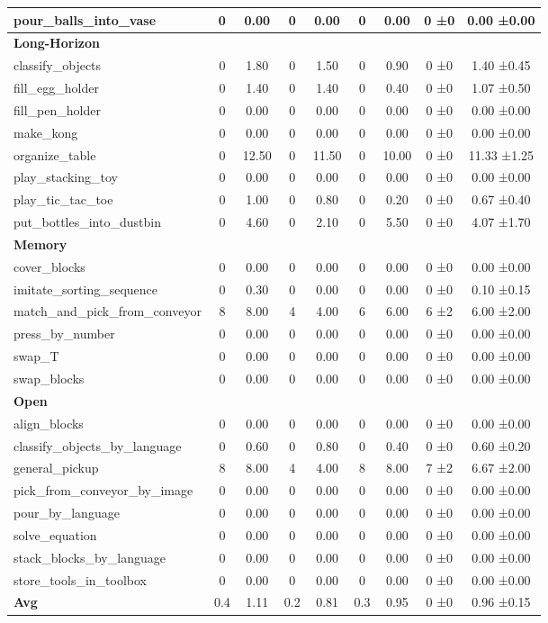 \begin{table}[H]
{\begin{tabular}{l|c|c|c|c|c|c|c|c}
pour\_balls\_into\_vase & 0 & 0.00 & 0 & 0.00 & 0 & 0.00 & 0 ±0 & 0.00 ±0.00 \\
\hline
\multicolumn{9}{l}{\textbf{Long-Horizon}} \\
classify\_objects & 0 & 1.80 & 0 & 1.50 & 0 & 0.90 & 0 ±0 & 1.40 ±0.45 \\
fill\_egg\_holder & 0 & 1.40 & 0 & 1.40 & 0 & 0.40 & 0 ±0 & 1.07 ±0.50 \\
fill\_pen\_holder & 0 & 0.00 & 0 & 0.00 & 0 & 0.00 & 0 ±0 & 0.00 ±0.00 \\
make\_kong & 0 & 0.00 & 0 & 0.00 & 0 & 0.00 & 0 ±0 & 0.00 ±0.00 \\
organize\_table & 0 & 12.50 & 0 & 11.50 & 0 & 10.00 & 0 ±0 & 11.33 ±1.25 \\
play\_stacking\_toy & 0 & 0.00 & 0 & 0.00 & 0 & 0.00 & 0 ±0 & 0.00 ±0.00 \\
play\_tic\_tac\_toe & 0 & 1.00 & 0 & 0.80 & 0 & 0.20 & 0 ±0 & 0.67 ±0.40 \\
put\_bottles\_into\_dustbin & 0 & 4.60 & 0 & 2.10 & 0 & 5.50 & 0 ±0 & 4.07 ±1.70 \\
\hline
\multicolumn{9}{l}{\textbf{Memory}} \\
cover\_blocks & 0 & 0.00 & 0 & 0.00 & 0 & 0.00 & 0 ±0 & 0.00 ±0.00 \\
imitate\_sorting\_sequence & 0 & 0.30 & 0 & 0.00 & 0 & 0.00 & 0 ±0 & 0.10 ±0.15 \\
match\_and\_pick\_from\_conveyor & 8 & 8.00 & 4 & 4.00 & 6 & 6.00 & 6 ±2 & 6.00 ±2.00 \\
press\_by\_number & 0 & 0.00 & 0 & 0.00 & 0 & 0.00 & 0 ±0 & 0.00 ±0.00 \\
swap\_T & 0 & 0.00 & 0 & 0.00 & 0 & 0.00 & 0 ±0 & 0.00 ±0.00 \\
swap\_blocks & 0 & 0.00 & 0 & 0.00 & 0 & 0.00 & 0 ±0 & 0.00 ±0.00 \\
\hline
\multicolumn{9}{l}{\textbf{Open}} \\
align\_blocks & 0 & 0.00 & 0 & 0.00 & 0 & 0.00 & 0 ±0 & 0.00 ±0.00 \\
classify\_objects\_by\_language & 0 & 0.60 & 0 & 0.80 & 0 & 0.40 & 0 ±0 & 0.60 ±0.20 \\
general\_pickup & 8 & 8.00 & 4 & 4.00 & 8 & 8.00 & 7 ±2 & 6.67 ±2.00 \\
pick\_from\_conveyor\_by\_image & 0 & 0.00 & 0 & 0.00 & 0 & 0.00 & 0 ±0 & 0.00 ±0.00 \\
pour\_by\_language & 0 & 0.00 & 0 & 0.00 & 0 & 0.00 & 0 ±0 & 0.00 ±0.00 \\
solve\_equation & 0 & 0.00 & 0 & 0.00 & 0 & 0.00 & 0 ±0 & 0.00 ±0.00 \\
stack\_blocks\_by\_language & 0 & 0.00 & 0 & 0.00 & 0 & 0.00 & 0 ±0 & 0.00 ±0.00 \\
store\_tools\_in\_toolbox & 0 & 0.00 & 0 & 0.00 & 0 & 0.00 & 0 ±0 & 0.00 ±0.00 \\
\hline
\textbf{Avg} & 0.4 & 1.11 & 0.2 & 0.81 & 0.3 & 0.95 & 0 ±0 & 0.96 ±0.15 \\
\hline
\end{tabular}
}
\end{table}
